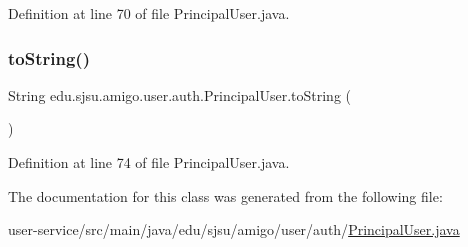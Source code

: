 Definition at line 70 of file Principal\+User.\+java.

\mbox{\label{classedu_1_1sjsu_1_1amigo_1_1user_1_1auth_1_1_principal_user_ae29192bb7ec56a93c4241e9cc4ad7876}} 
\subsubsection{\texorpdfstring{to\+String()}{toString()}}
{\footnotesize\ttfamily String edu.\+sjsu.\+amigo.\+user.\+auth.\+Principal\+User.\+to\+String (\begin{DoxyParamCaption}{ }\end{DoxyParamCaption})}



Definition at line 74 of file Principal\+User.\+java.



The documentation for this class was generated from the following file\+:\begin{DoxyCompactItemize}
\item 
user-\/service/src/main/java/edu/sjsu/amigo/user/auth/\hyperlink{_principal_user_8java}{Principal\+User.\+java}\end{DoxyCompactItemize}
